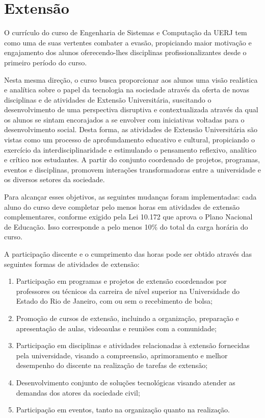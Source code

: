 \section{Extensão}

O currículo do curso de Engenharia de Sistemas e Computação da UERJ tem como uma de suas vertentes combater a evasão, propiciando maior motivação e engajamento dos alunos oferecendo-lhes disciplinas profissionalizantes desde o primeiro período do curso. 

Nesta mesma direção, o curso busca proporcionar aos alunos uma visão realística e analítica sobre o papel da tecnologia na sociedade através da oferta de novas disciplinas e de atividades de Extensão Universitária, suscitando o desenvolvimento de uma perspectiva disruptiva e contextualizada através da qual os alunos se sintam encorajados a se envolver com iniciativas voltadas para o desenvolvimento social. Desta forma, as atividades de Extensão Universitária são vistas como um processo de aprofundamento educativo e cultural, propiciando o exercício da interdisciplinaridade e estimulando o pensamento reflexivo, analítico e crítico nos estudantes. A partir do conjunto coordenado de projetos, programas, eventos e disciplinas, promovem interações transformadoras entre a universidade e os diversos setores da sociedade.

Para alcançar esses objetivos, as seguintes mudanças foram implementadas: cada aluno do curso deve completar pelo menos \hextensao horas em atividades de extensão complementares, conforme exigido pela Lei 10.172 que aprova o Plano Nacional de Educação. Isso corresponde a pelo menos 10\% do total da carga horária do curso.

A participação discente e o cumprimento das horas pode ser obtido através das seguintes formas de atividades de extensão:
\begin{enumerate}[I -]
    \item Participação em programas e projetos de extensão coordenados por professores ou técnicos da carreira de nível superior na Universidade do Estado do Rio de Janeiro, com ou sem o recebimento de bolsa;
    \item Promoção de cursos de extensão, incluindo a organização, preparação e apresentação de aulas, videoaulas e reuniões com a comunidade;
    \item Participação em disciplinas e atividades relacionadas à extensão fornecidas pela universidade, visando a compreensão, aprimoramento e melhor desempenho do discente na realização de tarefas de extensão;
    \item Desenvolvimento conjunto de soluções tecnológicas visando atender as demandas dos atores da sociedade civil;
    \item Participação em eventos, tanto na organização quanto na realização.
\end{enumerate}


